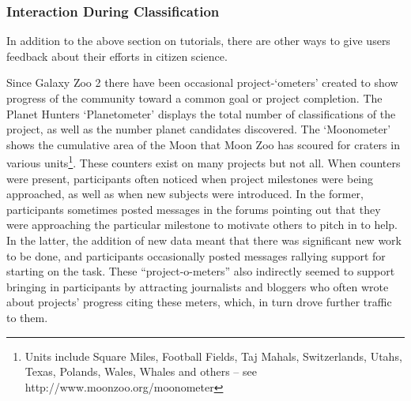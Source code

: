 \documentclass{sigchi}
\begin{document}
\subsubsection{Interaction During Classification}
In addition to the above section on tutorials, there are other ways to give users feedback about their efforts in citizen science.

Since Galaxy Zoo 2 there have been occasional project-`ometers' created to show progress of the community toward a common goal or project completion. The Planet Hunters `Planetometer' displays the total number of classifications of the project, as well as the number planet candidates discovered. The `Moonometer' shows the cumulative area of the Moon that Moon Zoo has scoured for craters in various units\footnote{Units include Square Miles, Football Fields, Taj Mahals, Switzerlands, Utahs, Texas, Polands, Wales, Whales and others -- see http://www.moonzoo.org/moonometer}. These counters exist on many projects but not all. When counters were present, participants often noticed when project milestones were being approached, as well as when new subjects were introduced.  In the former, participants sometimes posted messages in the forums pointing out that they were approaching the particular milestone to motivate others to pitch in to help.  In the latter, the addition of new data meant that there was significant new work to be done, and participants occasionally posted messages rallying support for starting on the task.  These ``project-o-meters'' also indirectly seemed to support bringing in  participants by attracting journalists and bloggers who often wrote about projects' progress citing these meters, which, in turn drove further traffic to them. 


\end{document}

